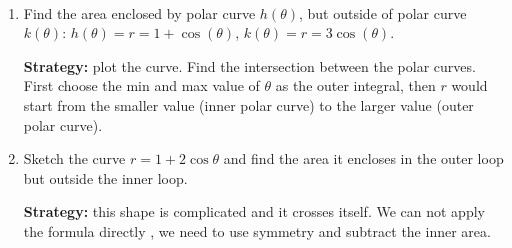 \begin{exercise}
$\text{ }$

    \begin{enumerate}[label=\alph*)]
        \item Find the area enclosed by polar curve $h(\theta)$, but outside of polar curve $k(\theta)$: $h(\theta) = r = 1 + \cos(\theta)$, $k(\theta) = r = 3\cos(\theta)$. 

        \textbf{Strategy: } plot the curve. Find the intersection between the polar curves. First choose the min and max value of $\theta$ as the outer integral, then $r$ would start from the smaller value (inner polar curve) to the larger value (outer polar curve).

        \item Sketch the curve $r = 1 + 2\cos{\theta}$ and find the area it encloses in the outer loop but outside the inner loop.

        \textbf{Strategy: } this shape is complicated and it crosses itself. We can not apply the formula directly , we need to use symmetry and subtract the inner area.
    \end{enumerate}
\end{exercise}